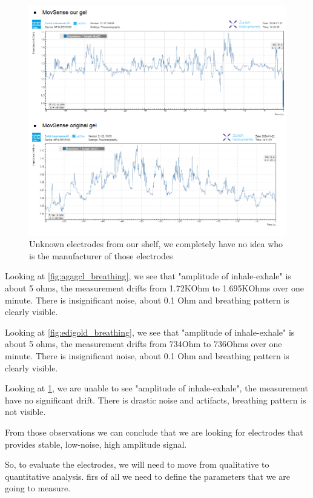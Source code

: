 \begin{figure}
    \centering
    \includegraphics[width=1.2\linewidth]{figures/PlaceHolders/MovSense_Placeholder.png}
    \caption{Unknown electrodes from our shelf, we completely have no idea who is the manufacturer of those electrodes}
    \label{fig:movsense_breathing}
\end{figure}

Looking at \ref{fig:agagcl_breathing}, we see that "amplitude of inhale-exhale" is about 5 ohms, the measurement drifts from 1.72KOhm to 1.695KOhms over one minute. There is insignificant noise, about 0.1 Ohm and breathing pattern is clearly visible.

Looking at \ref{fig:edigold_breathing}, we see that "amplitude of inhale-exhale" is about 5 ohms, the measurement drifts from 734Ohm to 736Ohms over one minute. There is insignificant noise, about 0.1 Ohm and breathing pattern is clearly visible.

Looking at \ref{fig:movsense_breathing}, we are unable to see "amplitude of inhale-exhale", the measurement have no significant drift. There is drastic noise and artifacts, breathing pattern is not visible.

From those observations we can conclude that we are looking for electrodes that provides stable, low-noise, high amplitude signal.

So, to evaluate the electrodes, we will need to move from qualitative to quantitative analysis. firs of all we need to define the parameters that we are going to measure.

